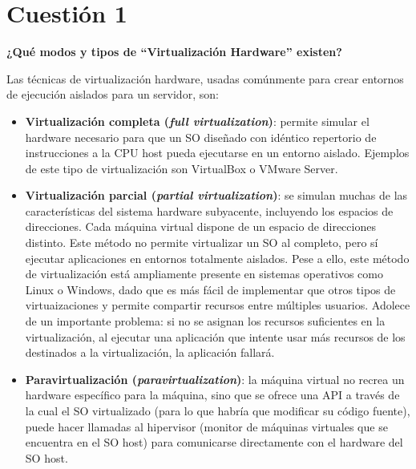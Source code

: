 \documentclass[a4paper,11pt]{article}
\newenvironment{answer}{%
\begin{list}{}{%
}%
\item[]}{\end{list}}
\newcommand{\imagent}[4]{
  \begin{figure}
    \begin{center}
    \texttt{[image: \#1]}
    \end{center}
    \caption{#3}
    \label{#4}
  \end{figure}
}
\newcommand{\imagen}[4]{
  \begin{minipage}{\linewidth}
    \centering
    \texttt{[image: \#1]}
    \captionof{figure}{#2}
    \label{#3}
  \end{minipage} 
}
\begin{document}
\newpage
\tableofcontents
\newpage

\section{Cuestión 1}
\textbf{¿Qué modos y tipos de “Virtualización Hardware” existen?}
\begin{answer}
 Las técnicas de virtualización hardware, usadas comúnmente para crear entornos de ejecución aislados para un 
 servidor, son: \cite{hardv} \cite{virt}
 \begin{itemize}
  \item \textbf{Virtualización completa (\textit{full virtualization})}: permite simular el hardware necesario
  para que un SO diseñado con idéntico repertorio de instrucciones a la CPU host pueda ejecutarse en un entorno
  aislado. Ejemplos de este tipo de virtualización son VirtualBox o VMware Server.

  \item \textbf{Virtualización parcial (\textit{partial virtualization})}: se simulan muchas de las características
  del sistema hardware subyacente, incluyendo los espacios de direcciones. Cada máquina virtual dispone de un
  espacio de direcciones distinto. Este método no permite virtualizar un SO al completo, pero sí ejecutar
  aplicaciones en entornos totalmente aislados. Pese a ello, este método de virtualización está ampliamente
  presente en sistemas operativos como Linux o Windows, dado que es más fácil de implementar que otros
  tipos de virtuaizaciones y permite compartir recursos entre múltiples usuarios. Adolece de un importante problema:
  si no se asignan los recursos suficientes en la virtualización, al ejecutar una aplicación que intente
  usar más recursos de los destinados a la virtualización, la aplicación fallará.

  \item \textbf{Paravirtualización (\textit{paravirtualization})}: la máquina virtual no recrea un hardware
  específico para la máquina, sino que se ofrece una API a través de la cual el SO virtualizado (para lo que
  habría que modificar su código fuente), puede hacer llamadas al hipervisor (monitor de máquinas virtuales
  que se encuentra en el SO host) para comunicarse directamente con el hardware del SO host.\\
  
 \end{itemize}
\end{answer}
\end{document}
